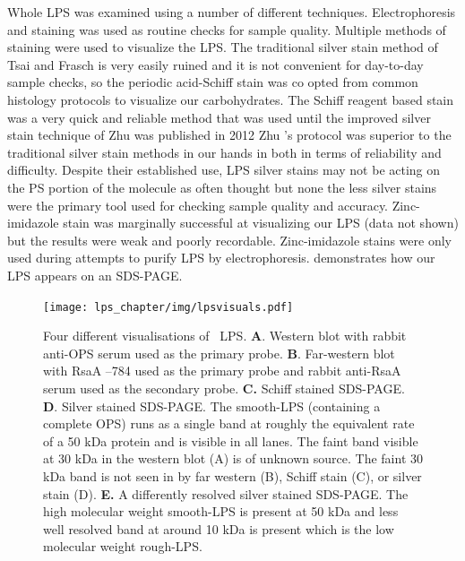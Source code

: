 Whole \caulobacter{} \ac{LPS} was examined using a number of different techniques. Electrophoresis and staining was used as routine checks for sample quality.  Multiple methods of staining were used to visualize the \ac{LPS}. The traditional silver stain method of Tsai and Frasch is very easily ruined and it is not convenient for day-to-day sample checks, so the periodic acid-Schiff stain was co opted from common histology protocols to visualize our carbohydrates.  The Schiff reagent based stain was a very quick and reliable method that was used until the improved silver stain technique of Zhu \etal{} was published in 2012 Zhu \etal{}'s protocol was superior to the traditional silver stain methods in our hands in both in terms of reliability and difficulty. Despite their established use,  \ac{LPS} silver stains may not be acting on the \ac{PS} portion of the molecule as often thought but none the less silver stains were the primary tool used for checking sample quality and accuracy. Zinc-imidazole stain was marginally successful at visualizing our \ac{LPS} (data not shown) but the results were weak and poorly recordable. Zinc-imidazole stains were only used during attempts to purify \ac{LPS} by electrophoresis.  demonstrates how our \ac{LPS} appears on an \ac{SDS-PAGE}.

\begin{figure}[htp]
  \begin{center}
    \texttt{[image: lps\_chapter/img/lpsvisuals.pdf]}
  \end{center}
  \caption[Four different visualisations of \caulobacter\ \ac{LPS}]{Four different visualisations
    of \caulobacter\ \ac{LPS}. \textbf{A}. Western blot with rabbit anti-\ac{OPS} serum used as
    the primary probe. \textbf{B}. Far-western blot with RsaA --784 used as the primary
    probe and rabbit anti-RsaA serum used as the secondary probe. \textbf{C.} Schiff stained
    \ac{SDS-PAGE}. \textbf{D}. Silver stained \ac{SDS-PAGE}. The smooth-\ac{LPS} (\ie containing a
    complete \ac{OPS}) runs as a single band at roughly the equivalent rate of a 50 kDa protein
    and is visible in all lanes. The faint band visible at 30 kDa in the western blot (A) is of
    unknown source. The faint 30 kDa band is not seen in by far western (B), Schiff stain (C), or
    silver stain (D). \textbf{E.} A differently resolved silver stained \ac{SDS-PAGE}. The high molecular weight smooth-\ac{LPS} is present at 50 kDa and less well resolved band at around 10 kDa is present which is the low molecular weight rough-\ac{LPS}.}
  \label{fig:lpsvisuals}
\end{figure}

